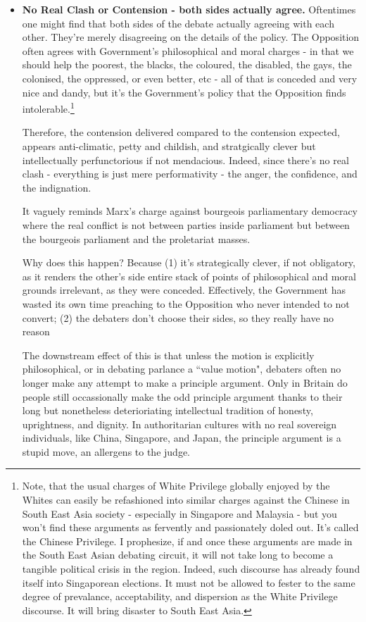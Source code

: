 \begin{itemize}
\item \textbf{No Real Clash or Contension - both sides actually agree.} Oftentimes one might find that both sides of the debate actually agreeing with each other. They're merely disagreeing on the details of the policy. The Opposition often agrees with Government's philosophical and moral charges - in that we should help the poorest, the blacks, the coloured, the disabled, the gays, the colonised, the oppressed, or even better, etc - all of that is conceded and very nice and dandy, but it's the Government's policy that the Opposition finds intolerable.\footnote{Note, that the usual charges of White Privilege globally enjoyed by the Whites can easily be refashioned into similar charges against the Chinese in South East Asia society - especially in Singapore and Malaysia - but you won't find these arguments as fervently and passionately doled out. It's called the Chinese Privilege. I prophesize, if and once these arguments are made in the South East Asian debating circuit, it will not take long to become a tangible political crisis in the region. Indeed, such discourse has already found itself into Singaporean elections. It must not be allowed to fester to the same degree of prevalance, acceptability, and dispersion as the White Privilege discourse. It will bring disaster to South East Asia.}
    
    Therefore, the contension delivered compared to the contension expected, appears anti-climatic, petty and childish, and stratgically clever but intellectually perfunctorious if not mendacious. Indeed, since there's no real clash - everything is just mere performativity - the anger, the confidence, and the indignation.

    It vaguely reminds Marx's charge against bourgeois parliamentary democracy where the real conflict is not between parties inside parliament but between the bourgeois parliament and the proletariat masses.

    Why does this happen? Because (1) it's strategically clever, if not obligatory, as it renders the other's side entire stack of points of philosophical and moral grounds irrelevant, as they were conceded. Effectively, the Government has wasted its own time preaching to the Opposition who never intended to not convert; (2) the debaters don't choose their sides, so they really have no reason 

    The downstream effect of this is that unless the motion is explicitly philosophical, or in debating parlance a “value motion", debaters often no longer make any attempt to make a principle argument. Only in Britain do people still occassionally make the odd principle argument thanks to their long but nonetheless deterioriating intellectual tradition of honesty, uprightness, and dignity. In authoritarian cultures with no real sovereign individuals, like China, Singapore, and Japan, the principle argument is a stupid move, an allergens to the judge.


\end{itemize}
